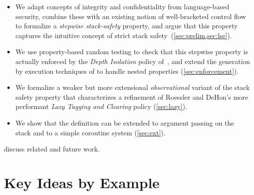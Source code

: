 \documentclass[acmsmall,review,anonymous]{acmart}\settopmatter{printfolios=true,printccs=false,printacmref=false}
\begin{document}
\begin{itemize}
\item We adapt concepts of integrity and confidentiality from language-based
security, combine these with an existing notion of well-bracketed
control flow to formalize a {\em stepwise stack-safety}
property, and argue that this property captures the intuitive concept of
strict stack
safety~(\cref{sec:prelim,sec:lse}).
\item We use property-based random testing to check that this stepwise
property is actually enforced by the {\em Depth Isolation} policy
of~\citet{DBLP:conf/sp/RoesslerD18}, and extend the generation by
execution techniques of \citet{TestingNI:ICFP} to handle nested
properties (\cref{sec:enforcement}).
\item We formalize a
weaker but more extensional \emph{observational} variant of the stack safety
property that characterizes a refinement of Roessler and DeHon's more
performant {\em Lazy Tagging and  Clearing} policy (\cref{sec:lazy}).
\item We show that the definition can be
extended to argument passing on the stack and to a simple coroutine system (\cref{sec:ext}).
\end{itemize}

 discuss related and future work.

\section{Key Ideas by Example}
\label{sec:running-example}

\newcommand{\mainsealc}{cyan}
\newcommand{\fsealc}{green}
\newcommand{\unsealc}{lgray}
\newcommand{\emptyoutc}{white} %
\newcommand{\fulloutc}{white}
\newcommand{\badc}{lred}
\newcommand{\goodc}{lblue}
\newcommand{\retptrc}{black}
\end{document}
